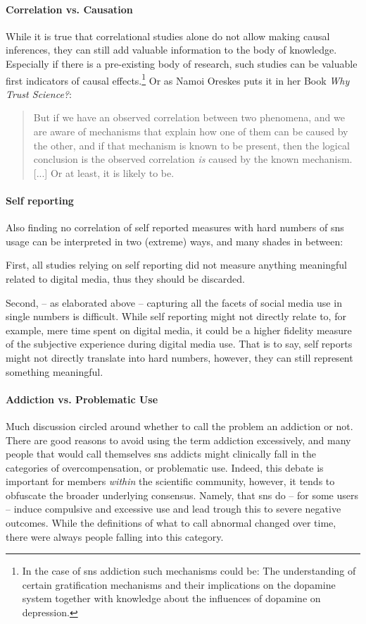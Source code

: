 \paragraph{Correlation vs. Causation} While it is true that correlational studies alone do not allow making causal inferences, they can still add valuable information to the body of knowledge.
Especially if there is a pre-existing body of research, such studies can be valuable first indicators of causal effects.\footnote{In the case of \gls{sns} addiction such mechanisms could be: The understanding of certain gratification mechanisms and their implications on the dopamine system together with knowledge about the influences of dopamine on depression.}
Or as Namoi Oreskes puts it in her Book \emph{Why Trust Science?}:
\begin{quote}
    But if we have an observed correlation between two phenomena, and we are aware of mechanisms that explain how one of them can be caused by the other, and if that mechanism is known to be present, then the logical conclusion is the observed correlation \emph{is} caused by the known mechanism. [...] Or at least, it is likely to be.
\end{quote}
\citep[p 116]{oreskes_why_2019}

\paragraph{Self reporting} Also finding no correlation of self reported measures with hard numbers of \gls{sns} usage can be interpreted in two (extreme) ways, and many shades in between:

First, all studies relying on self reporting did not measure anything meaningful related to digital media, thus they should be discarded.

Second, -- as elaborated above -- capturing all the facets of social media use in single numbers is difficult.
While self reporting might not directly relate to, for example, mere time spent on digital media, it could be a higher fidelity measure of the subjective experience during digital media use.
That is to say, self reports might not directly translate into hard numbers, however, they can still represent something meaningful.

\paragraph{Addiction vs. Problematic Use}
Much discussion circled around whether to call the problem an addiction or not.
There are good reasons to avoid using the term addiction excessively, and many people that would call themselves \gls{sns} addicts might clinically fall in the categories of overcompensation, or problematic use.
Indeed, this debate is important for members \textit{within} the scientific community, however, it tends to obfuscate the broader underlying consensus.
Namely, that \gls{sns} do -- for some users -- induce compulsive and excessive use and lead trough this to severe negative outcomes. 
While the definitions of what to call abnormal changed over time, there were always people falling into this category.

